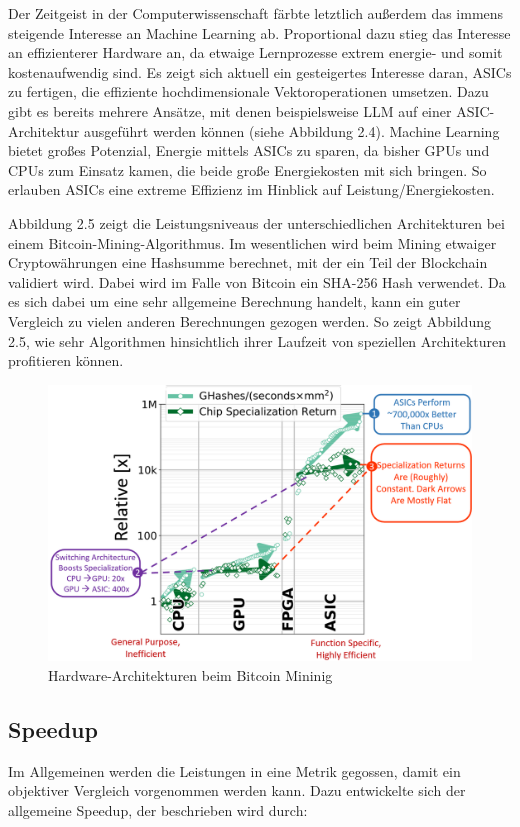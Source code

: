 Der Zeitgeist in der Computerwissenschaft färbte letztlich außerdem das immens steigende Interesse an Machine Learning ab. Proportional dazu stieg das Interesse an effizienterer Hardware an, da etwaige Lernprozesse extrem energie- und somit kostenaufwendig sind. Es zeigt sich aktuell ein gesteigertes Interesse daran, ASICs zu fertigen, die effiziente hochdimensionale Vektoroperationen umsetzen. Dazu gibt es bereits mehrere Ansätze, mit denen beispielsweise LLM auf einer ASIC-Architektur ausgeführt werden können (siehe Abbildung 2.4). Machine Learning bietet großes Potenzial, Energie mittels ASICs zu sparen, da bisher GPUs und CPUs zum Einsatz kamen, die beide große Energiekosten mit sich bringen. So erlauben ASICs eine extreme Effizienz im Hinblick auf Leistung/Energiekosten.

Abbildung 2.5 zeigt die Leistungsniveaus der unterschiedlichen Architekturen bei einem Bitcoin-Mining-Algorithmus. Im wesentlichen wird beim Mining etwaiger Cryptowährungen eine Hashsumme berechnet, mit der ein Teil der Blockchain validiert wird. Dabei wird im Falle von Bitcoin ein SHA-256 Hash verwendet. Da es sich dabei um eine sehr allgemeine Berechnung handelt, kann ein guter Vergleich zu vielen anderen Berechnungen gezogen werden. So zeigt Abbildung 2.5, wie sehr Algorithmen hinsichtlich ihrer Laufzeit von speziellen Architekturen profitieren können.

\begin{figure}
    \centering
    \includegraphics[width=0.7\linewidth]{images/aisic.png}
    \caption{Hardware-Architekturen beim Bitcoin Mininig \cite{bitcoin}}
    \label{fig:enter-label}
\end{figure}
\subsection{Speedup}
Im Allgemeinen werden die Leistungen in eine Metrik gegossen, damit ein objektiver Vergleich vorgenommen werden kann. Dazu entwickelte sich der allgemeine Speedup, der beschrieben wird durch: \cite{speedup}

